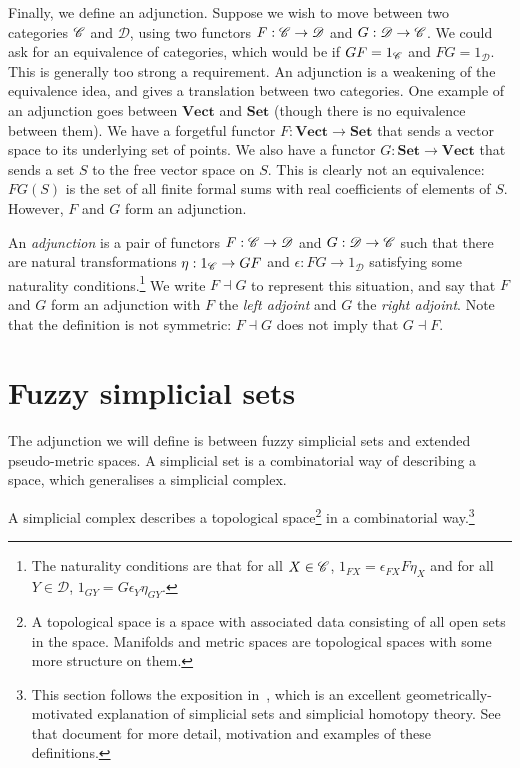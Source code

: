 \documentclass[a4paper,11pt,leqno]{article} \usepackage{amsmath}
\newcommand{\curD}{\mathscr{D}} \newcommand{\curI}{\mathscr{I}}
\theoremstyle{definition} \newtheorem{defn}{Definition}
\begin{document}
Finally, we define an adjunction.  Suppose we wish to move between two
categories $\mathscr{C}$ and $\curD$, using two functors $F: \curC\to\curD$ and $G:
\curD\to\curC$.  We could ask for an equivalence of categories, which would be
if $GF = 1_{\mathscr{C}}$ and $FG = 1_{\curD}$.  This is generally too strong
a requirement.  An adjunction is a weakening of the equivalence idea, and gives
a translation between two categories.  One example of an adjunction goes between
$\textbf{Vect}$ and $\textbf{Set}$ (though there is no equivalence between
them).  We have a forgetful functor $F: \textbf{Vect}\to \textbf{Set}$ that
sends a vector space to its underlying set of points.  We also have a functor
$G: \textbf{Set}\to \textbf{Vect}$ that sends a set $S$ to the free vector space
on $S$.  This is clearly not an equivalence: $FG(S)$ is the set of all finite
formal sums with real coefficients of elements of $S$.  However, $F$ and $G$
form an adjunction.

An \emph{adjunction} is a pair of functors $F: \curC\to\curD$ and $G:
\curD\to\curC$ such that there are natural transformations $\eta: 1_{\mathscr{C}}\to GF$
and $\epsilon: FG\to 1_\curD$ satisfying some naturality conditions.\footnote{
  The naturality conditions are that for all $X\in\mathscr{C}$, $1_{FX}
  = \epsilon_{FX}F\eta_X$ and for all $Y\in\curD$, $1_{GY}
  = G\epsilon_Y\eta_{GY}$.} We write $F\dashv G$ to represent this situation,
and say that $F$ and $G$ form an adjunction with $F$ the \emph{left adjoint} and
$G$ the \emph{right adjoint}.  Note that the definition is not symmetric:
$F\dashv G$ does not imply that $G\dashv F$.

\section{Fuzzy simplicial sets}
\label{section_fss}

The adjunction we will define is between fuzzy simplicial sets and extended
pseudo-metric spaces. A simplicial set is a combinatorial way of describing
a space, which generalises a simplicial complex.

A simplicial complex describes a topological space\footnote{ A topological space
is a space with associated data consisting of all open sets in the space.
Manifolds and metric spaces are topological spaces with some more structure on
them.} in a combinatorial way.\footnote{ This section follows the exposition
in~\cite{Friedman08}, which is an excellent geometrically-motivated explanation
of simplicial sets and simplicial homotopy theory. See that document for more
detail, motivation and examples of these definitions.}
\end{document}
